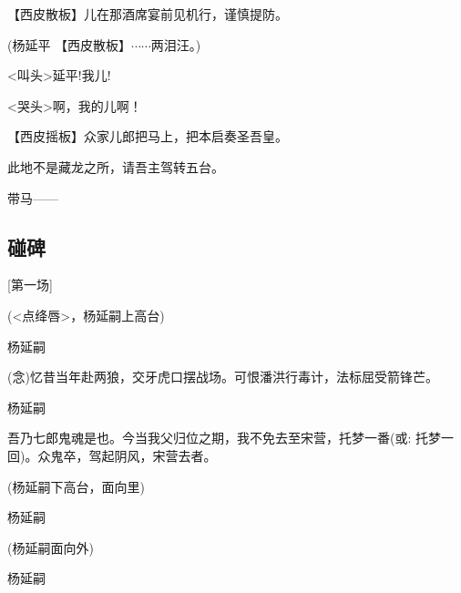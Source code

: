 \setlength{\hangindent}{60pt} {【{\akai 西皮散板}】儿在那酒席宴前见机行，谨慎提防。}

{(杨延平 【{\akai 西皮散板}】$\cdots{}\cdots{}$两泪汪。)}

{\textless{}叫头\textgreater{}延平!我儿!}

{\textless{}哭头\textgreater{}啊，我的儿啊！}

\setlength{\hangindent}{60pt} {【{\akai 西皮摇板}】众家儿郎把马上，把本启奏圣吾皇。}

{此地不是藏龙之所，请吾主驾转五台。}

{带马------}

\newpage

\hypertarget{ux78b0ux7891}{%

\subsection{碰碑}\label{ux78b0ux7891}}

{{[}第一场{]}}

{(\textless{}点绛唇\textgreater{}，杨延嗣上高台)}

{杨延嗣

({\akai 念})忆昔当年赴两狼，交牙虎口摆战场。可恨潘洪行毒计，法标屈受箭锋芒。}

{杨延嗣

吾乃七郎鬼魂是也。今当我父归位之期，我不免去至宋营，托梦一番({\akai 或}: 托梦一回)。众鬼卒，驾起阴风，宋营去者。}

{(杨延嗣下高台，面向里)}

{杨延嗣\hspace{20pt}~

 }

{(杨延嗣面向外)}

{杨延嗣\hspace{20pt}~

 }

